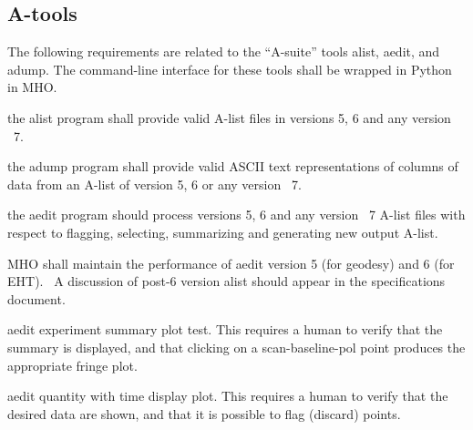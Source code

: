 \subsection{A-tools}
\label{sec:areq}

The following requirements are related to the ``A-suite'' tools alist, aedit,
and adump.  The command-line interface for these tools shall be wrapped 
in Python in \acs{MHO}.


\begin{description}

 the \acs{alist} program shall provide valid \acs{A-list}
    files in versions 5, 6 and any version \TBD~7.

 the \acs{adump} program shall provide valid ASCII text
    representations of columns of data from an \acs{A-list} of version
    5, 6 or any version \TBD~7.

 the \acs{aedit} program should process versions 5, 6 and
    any version \TBD~7 \acs{A-list} files with respect to flagging,
    selecting, summarizing and generating new output \acs{A-list}.


                    
 \ac{MHO} shall maintain the performance of \acs{aedit} version
5 (for geodesy) and 6 (for EHT). \TBD~A discussion of post-6 
version alist should appear in the specifications document.

 \acs{aedit} experiment summary plot test.  This requires a
    human to verify that the summary is displayed, and that clicking
    on a scan-baseline-pol point produces the appropriate fringe plot.

 \acs{aedit} quantity with time display plot.  This requires
    a human to verify that the desired data are shown, and that it
    is possible to flag (discard) points.


\end{description}

